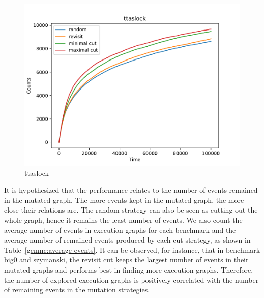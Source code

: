 \begin{figure}[h!]
	\vspace{0.5cm}
	\begin{minipage}{0.45\textwidth}
		\centering
		\includegraphics[width=\textwidth]{figure/genmc/ttaslock.pdf}
		\caption{ttaslock}
		\label{genmc:ttaslock}
	\end{minipage}
	\hfill
	\begin{minipage}{0.45\textwidth}
		\centering
	\end{minipage}
\end{figure}

It is hypothesized that the performance relates to the number of events remained in the mutated graph. The more events kept in the mutated graph, the more close their relations are. The random strategy can also be seen as cutting out the whole graph, hence it remains the least number of events. We also count the average number of events in execution graphs for each benchmark and the average number of remained events produced by each cut strategy, as shown in Table~\ref{genmc:average-events}. It can be observed, for instance, that in benchmark big0 and szymanski, the revisit cut keeps the largest number of events in their mutated graphs and performs best in finding more execution graphs. Therefore, the number of explored execution graphs is positively correlated with the number of remaining events in the mutation strategies.



